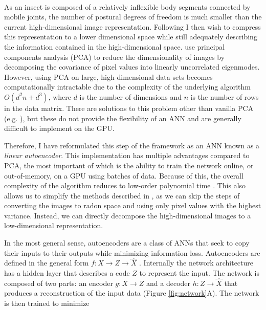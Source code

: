 \documentclass[11pt,a4paper,oneside]{article}
\begin{document}
\begin{appendices}
\paragraph{}
As an insect is composed of a relatively inflexible body segments connected by mobile joints, the number of postural degrees of freedom is much smaller than the current high-dimensional image representation. Following \cite{berman2014mapping,berman2014drosopholid} I then wish to compress this representation to a lower dimensional space while still adequately describing the information contained in the high-dimensional space. \cite{berman2014mapping,berman2014drosopholid} use principal components analysis (PCA) to reduce the dimensionality of images by decomposing the covariance of pixel values into linearly uncorrelated eigenmodes. However, using PCA on large, high-dimensional data sets becomes computationally intractable due to the complexity of the underlying algorithm $O(d^2n+d^3)$, where $d$ is the number of dimensions and $n$ is the number of rows in the data matrix. There are solutions to this problem other than vanilla PCA (e.g. \citealp{rokhlin2009randomized,artac2002incremental}), but these do not provide the flexibility of an ANN and are generally difficult to implement on the GPU. 
\par
Therefore, I have reformulated this step of the framework as an ANN known as a \textit{linear autoencoder}. This implementation has multiple advantages compared to PCA, the most important of which is the ability to train the network online, or out-of-memory, on a GPU using batches of data. Because of this, the overall complexity of the algorithm reduces to low-order polynomial time \citep{magdon2015}. This also allows us to simplify the methods described in \cite{berman2014drosopholid,berman2014mapping}, as we can skip the steps of converting the images to radon space and using only pixel values with the highest variance. Instead, we can directly decompose the high-dimensional images to a low-dimensional representation. 
\par 
In the most general sense, autoencoders are a class of ANNs that seek to copy their inputs to their outputs while minimizing information loss. Autoencoders are defined in the general form $f: X \to Z \to \hat{X}$ \citep{deeplearningbook,hinton2006autoencoder,williams1986learning}. Internally the network architecture has a hidden layer that describes a code $Z$ to represent the input. The network is composed of two parts: an encoder $g: X \to Z$ and a decoder $h: Z \to \hat{X}$ that produces a reconstruction of the input data  (Figure \ref{fig:network}A). The network is then trained to minimize


\end{appendices}
\end{document}
